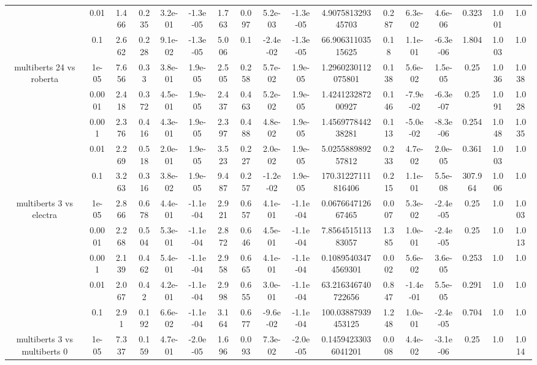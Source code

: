 \begin{tabular}{|c|c|c|c|c|c|c|c|c|c|c|c|c|c|c|c|c|}
 & 0.01 & 1.466 & 0.235 & 3.2e-01 & -1.3e-05 & 1.763 & 0.097 & 5.2e-03 & -1.3e-05 & 4.907581329345703 & 0.287 & 6.3e-02 & 4.6e-06 & 0.323 & 1.001 & 1.0 \\
 & 0.1 & 2.662 & 0.228 & 9.1e-02 & -1.3e-05 & 5.006 & 0.1 & -2.4e-02 & -1.3e-05 & 66.90631103515625 & 0.18 & 1.1e-01 & -6.3e-06 & 1.804 & 1.003 & 1.0 \\
\hline
\multirow{5}{*}{multiberts 24 vs roberta } & 1e-05 & 7.656 & 0.33 & 3.8e-01 & 1.9e-05 & 2.505 & 0.258 & 5.7e-02 & 1.9e-05 & 1.2960230112075801 & 0.138 & 5.6e-02 & 1.5e-05 & 0.25 & 1.036 & 1.038 \\
 & 0.0001 & 2.418 & 0.372 & 4.5e-01 & 1.9e-05 & 2.437 & 0.463 & 5.2e-02 & 1.9e-05 & 1.424123287200927 & 0.146 & -7.9e-02 & -6.3e-07 & 0.25 & 1.091 & 1.028 \\
 & 0.001 & 2.376 & 0.416 & 4.3e-01 & 1.9e-05 & 2.397 & 0.488 & 4.8e-02 & 1.9e-05 & 1.456977844238281 & 0.113 & -5.0e-02 & -8.3e-06 & 0.254 & 1.048 & 1.035 \\
 & 0.01 & 2.269 & 0.518 & 2.0e-01 & 1.9e-05 & 3.523 & 0.227 & 2.0e-02 & 1.9e-05 & 5.025588989257812 & 0.233 & 4.7e-02 & 2.0e-05 & 0.361 & 1.003 & 1.0 \\
 & 0.1 & 3.263 & 0.316 & 3.8e-02 & 1.9e-05 & 9.487 & 0.257 & -1.2e-02 & 1.9e-05 & 170.31227111816406 & 0.215 & 1.1e-01 & 5.5e-08 & 307.964 & 1.006 & 1.0 \\
\hline
\multirow{5}{*}{multiberts 3 vs electra } & 1e-05 & 2.866 & 0.678 & 4.4e-01 & -1.1e-04 & 2.921 & 0.657 & 4.1e-01 & -1.1e-04 & 0.067664712667465 & 0.007 & 5.3e-02 & -2.4e-05 & 0.25 & 1.0 & 1.003 \\
 & 0.0001 & 2.268 & 0.504 & 5.3e-01 & -1.1e-04 & 2.872 & 0.646 & 4.5e-01 & -1.1e-04 & 7.856451511383057 & 1.385 & 1.0e-01 & -2.4e-05 & 0.25 & 1.0 & 1.013 \\
 & 0.001 & 2.139 & 0.462 & 5.4e-01 & -1.1e-04 & 2.958 & 0.665 & 4.1e-01 & -1.1e-04 & 0.10895403474569301 & 0.002 & 5.6e-02 & 3.6e-05 & 0.253 & 1.0 & 1.0 \\
 & 0.01 & 2.067 & 0.42 & 4.2e-01 & -1.1e-04 & 2.998 & 0.655 & 3.0e-01 & -1.1e-04 & 63.216346740722656 & 0.847 & -1.4e-01 & 5.5e-05 & 0.291 & 1.0 & 1.0 \\
 & 0.1 & 2.91 & 0.192 & 6.6e-02 & -1.1e-04 & 3.164 & 0.677 & -9.6e-02 & -1.1e-04 & 100.03887939453125 & 1.248 & 1.0e-01 & -2.4e-05 & 0.704 & 1.0 & 1.0 \\
\hline
\multirow{5}{*}{multiberts 3 vs multiberts 0} & 1e-05 & 7.337 & 0.159 & 4.7e-01 & -2.0e-05 & 1.696 & 0.093 & 7.3e-02 & -2.0e-05 & 0.14594233036041201 & 0.008 & 4.4e-02 & -3.1e-06 & 0.25 & 1.0 & 1.014 \\

\end{tabular}
